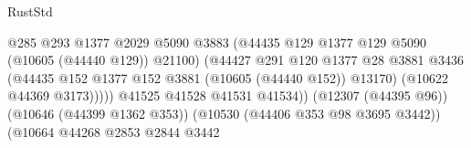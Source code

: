 \begin{lexlean}{RustStd}
\begin{coremodule}
                                                          @285
                                                          @293
                                                          @1377
                                                          @2029
                                                          @5090
                                                          @3883
                                                          (@44435
                                                            @129
                                                            @1377
                                                            @129
                                                            @5090
                                                            (@10605 (@44440 @129))
                                                            @21100)
                                                          (@44427
                                                            @291
                                                            @120
                                                            @1377
                                                            @28
                                                            @3881
                                                            @3436
                                                            (@44435
                                                              @152
                                                              @1377
                                                              @152
                                                              @3881
                                                              (@10605 (@44440 @152))
                                                              @13170)
                                                            (@10622 @44369 @3173)))))
                                                    @41525
                                                    @41528
                                                    @41531
                                                    @41534))
                                                (@12307 (@44395 @96))
                                                (@10646 (@44399 @1362 @353))
                                                (@10530 (@44406 @353 @98 @3695 @3442))
                                                (@10664
                                                  @44268
                                                  @2853
                                                  @2844
                                                  @3442

\end{coremodule}
\end{lexlean}

